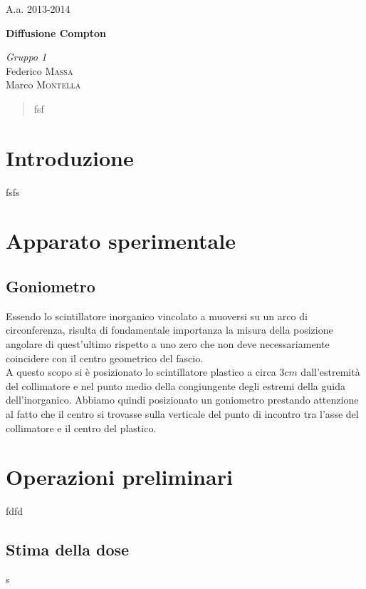 \documentclass[11pt]{article}
\begin{document}
\justify
\printindex
\Large{A.a. 2013-2014}
\vspace{10cm}
\begin{center}
\Huge\textbf{Diffusione Compton}
\end{center}

\vspace{2cm}
\begin{flushleft}
\textit{Gruppo \textsc{1}} \\
\medskip
Federico \textsc{Massa} \\ 
Marco \textsc{Montella}
\end{flushleft}



\newpage

\begin{abstract}
\justify
 fsf

\end{abstract}
\bigskip

\section{Introduzione}

fsfs

\section{Apparato sperimentale}
\subsection{Goniometro}
Essendo lo scintillatore inorganico vincolato a muoversi su un arco di circonferenza, risulta di fondamentale importanza la misura della posizione angolare di quest'ultimo rispetto a uno zero che non deve necessariamente coincidere con il centro geometrico del fascio. \\
A questo scopo si è posizionato lo scintillatore plastico a circa $3 cm$ dall'estremità del collimatore e nel punto medio della congiungente degli estremi della guida dell'inorganico. Abbiamo quindi posizionato un goniometro prestando attenzione al fatto che il centro si trovasse sulla verticale del punto di incontro tra l'asse del collimatore e il centro del plastico.

\section{Operazioni preliminari}
fdfd
\subsection{Stima della dose}
s
\end{document}
